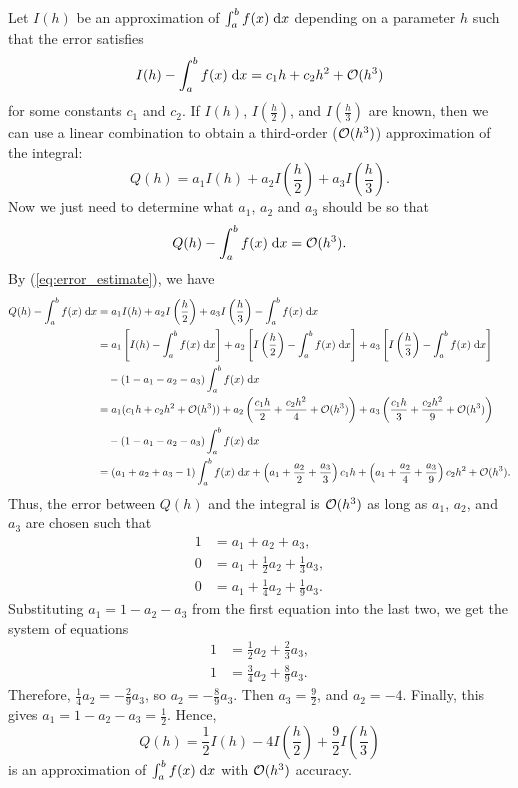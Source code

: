 \documentclass{homework}
\begin{document}
	\question
	Let $I(h)$ be an approximation of $\int_a^bf(x)\;\text{d} x$ depending on a parameter $h$ such that the error satisfies
	\begin{equation}
		\label{eq:error_estimate}
		I(h) - \int_a^bf(x)\;\text{d} x = c_1h + c_2h^2 +\mathcal{O}(h^3)
	\end{equation}
	for some constants $c_1$ and $c_2$. If $I(h)$, $I\left(\frac{h}{2}\right)$, and $I\left(\frac{h}{3}\right)$ are known, then we can use a linear combination to obtain a third-order ($\mathcal{O}(h^3)$) approximation of the integral:
	\begin{equation}
		Q(h) = a_1I(h) + a_2I\left(\frac{h}{2}\right) + a_3I\left(\frac{h}{3}\right).
	\end{equation}
	Now we just need to determine what $a_1$, $a_2$ and $a_3$ should be so that
	\begin{equation}
		Q(h) - \int_a^bf(x)\;\text{d} x = \mathcal{O}(h^3).
	\end{equation}
	By (\ref{eq:error_estimate}), we have
	\begin{align*}
		Q(h) - \int_a^bf(x)\;\text{d} x &= a_1I(h) + a_2I\left(\frac{h}{2}\right) + a_3I\left(\frac{h}{3}\right) - \int_a^bf(x)\;\text{d} x \\
		&= a_1\left[I(h) - \int_a^bf(x)\;\text{d} x\right] + a_2\left[I\left(\frac{h}{2}\right) - \int_a^bf(x)\;\text{d} x\right] + a_3\left[I\left(\frac{h}{3}\right) - \int_a^bf(x)\;\text{d} x\right] \\
		&\quad- (1 - a_1 - a_2 - a_3)\int_a^bf(x)\;\text{d} x \\
		&=a_1(c_1h + c_2h^2 + \mathcal{O}(h^3)) + a_2\left(\frac{c_1h}{2} + \frac{c_2h^2}{4} + \mathcal{O}(h^3)\right) + a_3\left(\frac{c_1h}{3} + \frac{c_2h^2}{9} + \mathcal{O}(h^3)\right) \\
		&\quad -(1-a_1-a_2-a_3)\int_a^bf(x)\;\text{d} x\\
		&= (a_1 + a_2 + a_3 -1)\int_a^bf(x)\;\text{d} x + \left(a_1 + \frac{a_2}{2} + \frac{a_3}{3}\right)c_1h + \left(a_1 + \frac{a_2}{4} + \frac{a_3}{9}\right)c_2h^2 + \mathcal{O}(h^3).
	\end{align*}
	Thus, the error between $Q(h)$ and the integral is $\mathcal{O}(h^3)$ as long as $a_1$, $a_2$, and $a_3$ are chosen such that
	\begin{align}
		1 &= a_1 + a_2 + a_3, \\
		0 &= a_1 + \frac{1}{2}a_2 + \frac{1}{3}a_3, \\
		0 &= a_1 + \frac{1}{4}a_2 + \frac{1}{9}a_3.
	\end{align}
	Substituting $a_1 = 1 - a_2 - a_3$ from the first equation into the last two, we get the system of equations
	\begin{align}
		1 &= \frac{1}{2}a_2 + \frac{2}{3}a_3, \\
		1 &= \frac{3}{4}a_2 + \frac{8}{9}a_3.
	\end{align}
	Therefore, $\frac{1}{4}a_2 = -\frac{2}{9}a_3$, so $a_2 =-\frac{8}{9}a_3$. Then $a_3 =\frac{9}{2}$, and $a_2 = -4$. Finally, this gives $a_1 = 1 - a_2 - a_3 = \frac{1}{2}$. Hence,
	\begin{equation}
		Q(h) = \frac{1}{2}I(h) -4I\left(\frac{h}{2}\right) + \frac{9}{2}I\left(\frac{h}{3}\right)
	\end{equation}
	is an approximation of $\int_a^bf(x)\;\text{d} x$ with $\mathcal{O}(h^3)$ accuracy.
\end{document}
